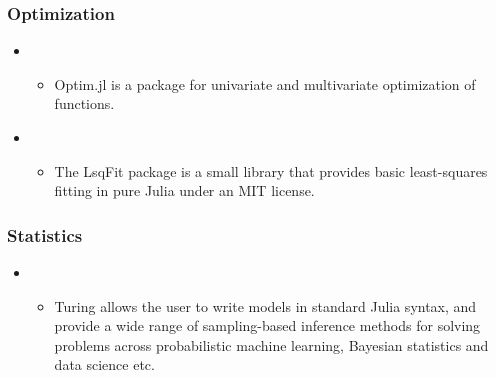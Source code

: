 \documentclass[letterpaper,10pt,english]{sphinxmanual}
\begin{document}
\subsubsection{Optimization}
\label{\detokenize{resource/programing/julia_basic:optimization}}\begin{itemize}
\item {} 
\begin{itemize}
\item {} 
Optim.jl is a package for univariate and multivariate optimization
of functions.

\end{itemize}

\item {} 
\begin{itemize}
\item {} 
The LsqFit package is a small library that provides basic
least-squares fitting in pure Julia under an MIT license.

\end{itemize}

\end{itemize}


\subsubsection{Statistics}
\label{\detokenize{resource/programing/julia_basic:statistics}}\begin{itemize}
\item {} 
\begin{itemize}
\item {} 
Turing allows the user to write models in standard Julia syntax,
and provide a wide range of sampling-based inference methods for
solving problems across probabilistic machine learning, Bayesian
statistics and data science etc.

\end{itemize}

\end{itemize}
\end{document}

